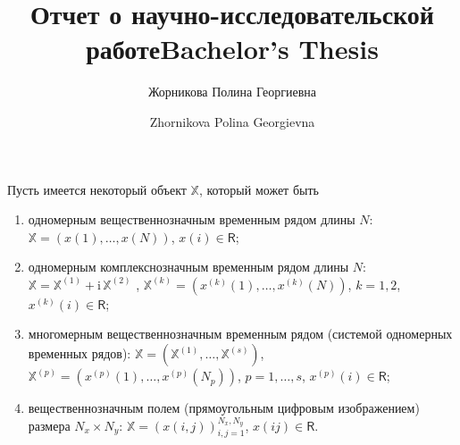\documentclass[specialist,
               substylefile = spbu.rtx,
               subf,href,colorlinks=true, 12pt]{disser}
\newcommand{\I}{\mathrm{i}}
\begin{document}
%
%


\title{Отчет о научно-исследовательской работе}


\author{Жорникова Полина Георгиевна}



\date{\number\year}

\maketitle

%
%
\title{Bachelor's Thesis}
%
%
\author{Zhornikova Polina Georgievna} %
%
%
%
\date{\number\year}
%

\tableofcontents

\intro
Пусть имеется некоторый объект $\mathbb{X}$, который может быть
\begin{enumerate}
\item одномерным вещественнозначным временным рядом длины $N$: $\mathbb{X}= (x(1),\ldots,x(N))$, $x(i) \in \mathsf{R}$;
\item одномерным комплекснозначным временным рядом длины $N$: $\mathbb{X}=\mathbb{X}^{(1)} + \I \,\mathbb{X}^{(2)}$ , $\mathbb{X}^{(k)}= \left(x^{(k)}(1),\ldots,x^{(k)}(N)\right)$, $k=1,2$, $x^{(k)}(i) \in \mathsf{R}$;
\item многомерным вещественнозначным временным рядом (системой одномерных временных рядов): $\mathbb{X}= \left(\mathbb{X}^{(1)}, \ldots,\mathbb{X}^{(s)}\right)$, $\mathbb{X}^{(p)}= \left(x^{(p)}(1),\ldots,x^{(p)}(N_p)\right)$, $p=1,\ldots,s$, $x^{(p)}(i) \in \mathsf{R}$;
\item вещественнозначным полем (прямоугольным цифровым изображением) размера $N_x \times N_y$: $\mathbb{X}= \left(x(i,j) \right)_{i,j=1}^{N_x,N_y}$, $x(ij) \in \mathsf{R}$.
\end{enumerate}
\end{document}
